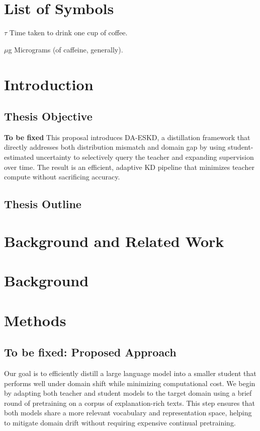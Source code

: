 \documentclass[draft]{uiucthesis2021}
\begin{document}
\chapter{List of Symbols}

\begin{symbollist}[0.7in]
\item[$\tau$] Time taken to drink one cup of coffee.
\item[$\mu$g] Micrograms (of caffeine, generally).
\end{symbollist}

\mainmatter

\chapter{Introduction}



\section{Thesis Objective}

\textbf{To be fixed}
This proposal introduces DA-ESKD, a distillation framework that directly addresses both distribution mismatch and domain gap by using student-estimated uncertainty to selectively query the teacher and expanding supervision over time. 
The result is an efficient, adaptive KD pipeline that minimizes teacher compute without sacrificing accuracy.

\section{Thesis Outline}

\chapter{Background and Related Work}


\chapter{Background}


\chapter{Methods}
\section{To be fixed: Proposed Approach}
Our goal is to efficiently distill a large language model into a smaller student that performs well under domain shift while minimizing computational cost. We begin by adapting both teacher and student models to the target domain using a brief round of pretraining on a corpus of explanation-rich texts. This step ensures that both models share a more relevant vocabulary and representation space, helping to mitigate domain drift without requiring expensive continual pretraining.
\end{document}
